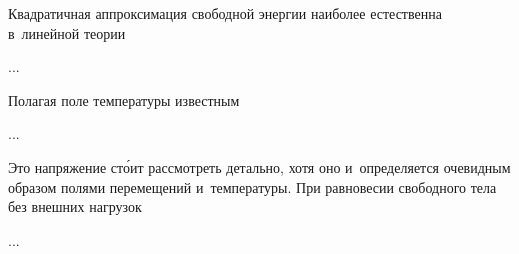 

\begin{otherlanguage}{russian}

Квадратичная аппроксимация свободной энергии наиболее естественна в~линейной теории

...



\end{otherlanguage}



\begin{otherlanguage}{russian}

Полагая поле температуры известным

...



\end{otherlanguage}



\begin{otherlanguage}{russian}

Это напряжение ст\'{о}ит рассмотреть детально, хотя оно и~определяется очевидным образом полями перемещений и~температуры. При равновесии свободного тела без внешних нагрузок

...



\end{otherlanguage}

